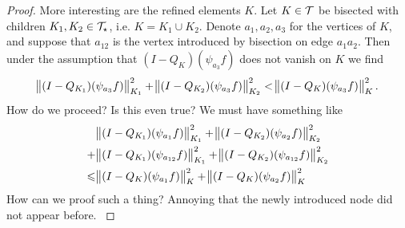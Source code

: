 \documentclass[thesis.tex]{subfiles}
\begin{document}
\begin{proof}
  More interesting are the refined elements $K$. Let $K \in \mathcal{T}$ be bisected with children $K_1, K_2 \in \mathcal{T}_{\star}$, i.e. $K = K_1 \cup K_2$.
  Denote $a_1,a_2,a_3$ for the vertices of $K$, and suppose that $a_{12}$ is the vertex introduced by bisection on edge $a_1a_2$.
  Then under the assumption that $(I-Q_K)(\psi_{a_3}f)$ does not vanish on $K$ we find
  \[
    \norm{(I-Q_{K_1})(\psi_{a_3}f)}^2_{K_1} + \norm{(I-Q_{K_2})(\psi_{a_3}f)}^2_{K_2} < \norm{(I-Q_K)(\psi_{a_3}f)}^2_K.
  \]
  {\color{blue}
  How do we proceed? Is this even true? We must have something like
  \begin{align*}
    &\norm{(I-Q_{K_1})(\psi_{a_1}f)}^2_{K_1} + \norm{(I-Q_{K_2})(\psi_{a_2}f)}^2_{K_2} \\
    +&\norm{(I-Q_{K_1})(\psi_{a_{12}}f)}^2_{K_1} + \norm{(I-Q_{K_2})(\psi_{a_{12}}f)}^2_{K_2}\\
    \leqslant &\norm{(I-Q_K)(\psi_{a_1}f)}^2_K + \norm{(I-Q_K)(\psi_{a_2}f)}^2_K
  \end{align*}
  How can we proof such a thing? Annoying that the newly introduced node did not appear before. 
}
\end{proof}
\end{document}

